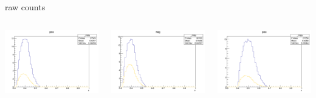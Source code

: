 \begin{frame}{raw counts}
\begin{columns}
\begin{column}[T]{0.25\textwidth}
\includegraphics[width = \textwidth]{results/yield/statistics/yield_x_Q2_z_0.60_4.775_0.40_pos.png}
\end{column}
\begin{column}[T]{0.25\textwidth}
\includegraphics[width = \textwidth]{results/yield/statistics/yield_x_Q2_z_0.60_4.775_0.40_neg.png}
\end{column}
\begin{column}[T]{0.25\textwidth}
\includegraphics[width = \textwidth]{results/yield/statistics/yield_x_Q2_z_0.60_4.775_0.50_pos.png}

\end{column}
\end{columns}
\end{frame}
